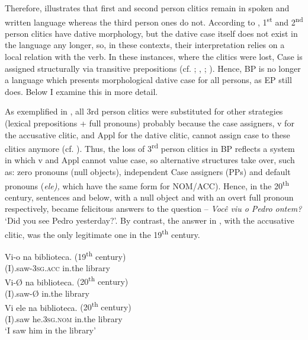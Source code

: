\documentclass[output=paper,colorlinks,citecolor=brown,nonflat]{./langscibook}
\begin{document}
Therefore,  illustrates that first and second person clitics remain in spoken and written language whereas the third person ones do not. According to \citet{Galves2018}, 1\textsuperscript{st} and 2\textsuperscript{nd} person clitics have dative morphology, but the dative case itself does not exist in the language any longer, so, in these contexts, their interpretation relies on a local relation with the verb. In these instances, where the clitics were lost, Case is assigned structurally via transitive prepositions (cf. \citealt{TorresMoraisSalles2010}; \citealt{Calindro2015}, \citeyear{Calindro2016}; \citealt{CarvalhoCalindro2018}). Hence, BP is no longer a language which presents morphological dative case for all persons, as EP still does. Below I examine this in more detail.

As exemplified in , all 3rd person clitics were substituted for other strategies (lexical prepositions + full pronouns) probably because the case assigners, v for the accusative clitic, and Appl for the dative clitic, cannot assign case to these clitics anymore (cf. \citealt{CarvalhoCalindro2018}). Thus, the loss of 3\textsuperscript{rd} person clitics in BP reflects a system in which v and Appl cannot value case, so alternative structures take over, such as: zero pronouns (null objects), independent Case assigners (PPs) and default pronouns (\textit{ele),} which have the same form for NOM/ACC). Hence, in the 20\textsuperscript{th} century, sentences  and  below, with a null object and with an overt full pronoun respectively, became felicitous answers to the question – \textit{Você viu o Pedro ontem?} ‘Did you see Pedro yesterday?’. By contrast, the answer in , with the accusative clitic, was the only legitimate one in the 19\textsuperscript{th} century. 

\ea%
    \label{ex:calindro:10}
    \ea\label{ex:calindro:10a}
    \gll Vi-{o}    na     biblioteca.  \hspace*{8em} {(19\textsuperscript{th} century)}\\
    (I).saw-\textsc{3sg.acc}     in.the     library\\
    \ex\label{ex:calindro:10b}
    \gll Vi-{Ø}    na   biblioteca.   \hspace*{10.5em}   {(20\textsuperscript{th} century)}\\
    (I).saw-Ø  in.the  library\\
    \ex\label{ex:calindro:10c}
    \gll Vi        {ele}                     na        biblioteca.  \hspace*{7em}  {(20\textsuperscript{th} century)}\\
    (I).saw    he.\textsc{3sg.nom}  in.the  library\\
    \glt ‘I saw him in the library’\hfill \citep[94]{CarvalhoCalindro2018}
    \z
\z
\end{document}
